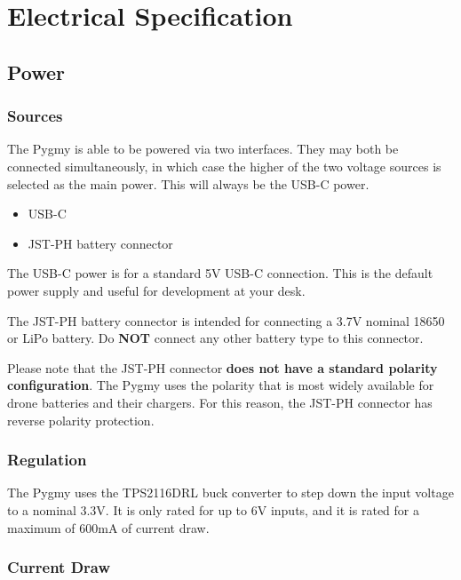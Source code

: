 \section{Electrical Specification}

\subsection{Power}

\subsubsection{Sources}

The Pygmy is able to be powered via two interfaces. They may both be connected simultaneously, in which case the higher
of the two voltage sources is selected as the main power. This will always be the USB-C power.

\begin{itemize}
    \item USB-C
    \item JST-PH battery connector
\end{itemize}

The USB-C power is for a standard 5V USB-C connection. This is the default power supply and useful for development at
your desk.

The JST-PH battery connector is intended for connecting a 3.7V nominal 18650 or LiPo battery. Do \textbf{NOT} connect
any other battery type to this connector.

Please note that the JST-PH connector \textbf{does not have a standard polarity configuration}. The Pygmy uses the
polarity that is most widely available for drone batteries and their chargers. For this reason, the JST-PH connector has
reverse polarity protection.

\subsubsection{Regulation}

The Pygmy uses the TPS2116DRL buck converter to step down the input voltage to a nominal 3.3V. It is only rated for up
to 6V inputs, and it is rated for a maximum of 600mA of current draw.

\subsubsection{Current Draw}

